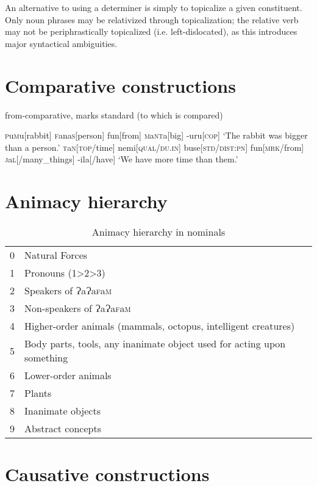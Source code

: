 \documentclass[a4paper,10pt,twoside,openright]{memoir}
\newcommand{\lang}{ɁaɁa\textsc{f}a\textsc{m}}
\newcommand{\famword}[5]{#1\textsc{#2}#3\textsc{#4}#5}
\begin{document}
An alternative to using a determiner is simply to topicalize a given constituent. Only noun phrases may be relativized through topicalization; the relative verb may not be periphrastically topicalized (i.e. left-dislocated), as this introduces major syntactical ambiguities.

\section{Comparative constructions}

from-comparative, marks standard (to which is compared)

\pex[interpartskip=3ex]
\a
\begingl
\famword{}{p}{u}{m}{u}[rabbit]
\famword{}{f}{ana}{s}{}[person]
fun[from]
\famword{}{m}{a}{nt}{a}[big]
-uru[\textsc{cop}]
\glft `The rabbit was bigger than a person.'
\endgl
\a
\begingl
\famword{}{t}{a}{n}{}[\textsc{top}/time]
nemi[\textsc{qual}/\textsc{du.in}]
buse[\textsc{std}/\textsc{dist:pn}]
fun[\textsc{mrk}/from]
\famword{}{j}{a}{l}{}[/many\_things]
-ila[/have]
\glft `We have more time than them.'
\endgl
\xe

\section{Animacy hierarchy}

\begin{table}[ht]
    \centering
    \begin{tabular}{ll}
    0 & Natural Forces \\
    1 & Pronouns (1>2>3) \\
    2 & Speakers of \lang{} \\
    3 & Non-speakers of \lang{} \\
    4 & Higher-order animals (mammals, octopus, intelligent creatures) \\
    5 & \parbox[t]{7cm}{Body parts, tools, any inanimate object used for acting upon something} \\
    6 & Lower-order animals \\
    7 & Plants \\
    8 & Inanimate objects \\
    9 & Abstract concepts 
    \end{tabular}
    \caption{Animacy hierarchy in nominals}
    \label{tab:hierarchy}
\end{table}

\section{Causative constructions}
\end{document}
